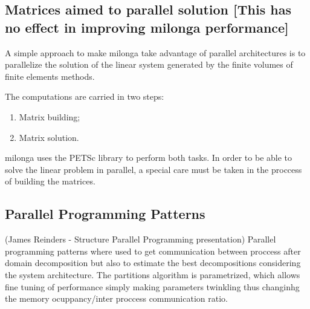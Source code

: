 \documentclass{anstrans}
\renewcommand{\vec}[1]{\bm{#1}} %
\newcommand{\vd}{\bm{\cdot}} %
\newcommand{\grad}{\vec{\nabla}} %
\newcommand{\ud}{\mathop{}\!\mathrm{d}} %
\begin{document}
\subsection{Matrices aimed to parallel solution [This has no effect in improving milonga performance]}
A simple approach to make milonga take advantage of parallel architectures is to parallelize the
solution of the linear system generated by the finite volumes of finite elements methods.

The computations are carried in two steps:
\begin{enumerate}
\item Matrix building;
  \item Matrix solution.
\end{enumerate}

milonga uses the PETSc library to perform both tasks. In order to be able to solve the linear problem
in parallel, a special care must be taken in the proccess of building the matrices.


\subsection{Parallel Programming Patterns}
(James Reinders - Structure Parallel Programming presentation)
Parallel programming patterns where used to get communication between proccess after
domain decomposition but also to estimate the best decompositions considering the system
architecture. The partitions algorithm is parametrized, which allows fine tuning of performance
simply making parameters twinkling thus changinhg the memory ocuppancy/inter proccess communication ratio.



\end{document}
